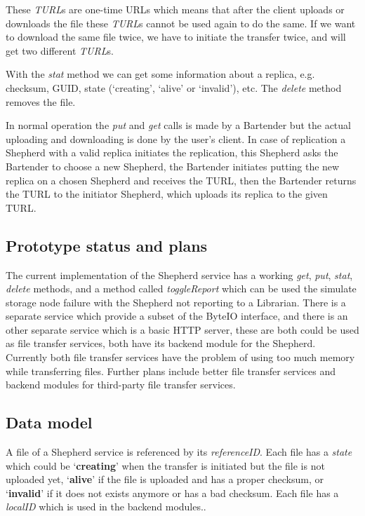 \documentclass{book}
\begin{document}
These \emph{TURL}s are one-time URLs which means that after the client uploads or downloads the file these \emph{TURL}s cannot be used again to do the same. If we want to download the same file twice, we have to initiate the transfer twice, and will get two different \emph{TURL}s.

With the \emph{stat} method we can get some information about a replica, e.g. checksum, GUID, state (`creating', `alive' or `invalid'), etc. The \emph{delete} method removes the file.

In normal operation the \emph{put} and \emph{get} calls is made by a Bartender but the actual uploading and downloading is done by the user’s client. In case of replication a Shepherd with a valid replica initiates the replication, this Shepherd asks the Bartender to choose a new Shepherd, the Bartender initiates putting the new replica on a chosen Shepherd and receives the TURL, then the Bartender returns the TURL to the initiator Shepherd, which uploads its replica to the given TURL.


\subsection{Prototype status and plans} %

The current implementation of the Shepherd service has a working \emph{get}, \emph{put}, \emph{stat}, \emph{delete} methods, and a method called \emph{toggleReport} which can be used the simulate storage node failure with the Shepherd not reporting to a Librarian. 
There is a separate service which provide a subset of the ByteIO interface, and there is an other separate service which is a basic HTTP server, these are both could be used as file transfer services, both have its backend module for the Shepherd. Currently both file transfer services have the problem of using too much memory while transferring files.
Further plans include better file transfer services and backend modules for third-party file transfer services.


\subsection{Data model} %

A file of a Shepherd service is referenced by its \emph{referenceID}. Each file has a \emph{state} which could be `\textbf{creating}' when the transfer is initiated but the file is not uploaded yet, `\textbf{alive}' if the file is uploaded and has a proper checksum, or `\textbf{invalid}' if it does not exists anymore or has a bad checksum. Each file has a \emph{localID} which is used in the backend modules..
\end{document}
